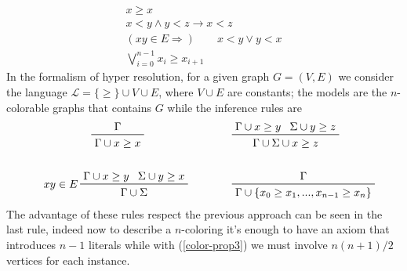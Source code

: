 \documentclass[a4paper,12pt,oneside]{book}
\let\o\vee
\let\e\wedge
\begin{document}
\begin{gather}
x\geq x\\
x<y \e y<z \rightarrow x<z \\
( xy \in E \Rightarrow ) \qquad  x<y \o y<x\\
\bigvee_{i=0}^{n-1} x_i\geq x_{i+1}
\end{gather}
In the formalism of hyper resolution, for a given graph $G=(V,E)$ we consider the language $\mathscr{L}=\{\geq\}\cup V\cup E$, where $V\cup E$ are constants; the models are the $n$-colorable graphs that contains $G$ while the inference rules are
\begin{align*}
\prftree{\Gamma}{\Gamma \cup x\geq x }\qquad \qquad\qquad
& \qquad\prftree{\Gamma\cup x\geq y}{ \Sigma\cup y\geq z }{\Gamma\cup\Sigma\cup x\geq z } \\
\,&\,\\
\prftree[l]{$\quad xy \in E $}{\Gamma \cup  x\geq y }{\Sigma \cup  y\geq x }
{ \Gamma\cup\Sigma} \qquad &\qquad \prftree{\Gamma}
{\Gamma\cup\{x_0\geq x_1 ,..., x_{n-1}\geq x_n \}}
\end{align*}
The advantage of these rules respect the previous approach can be seen in the last rule, indeed now to describe a $n$-coloring it's enough to have an axiom that introduces $n-1$ literals while with (\ref{color-prop3}) we must involve $n(n+1)/2$ vertices for each instance.
\end{document}
